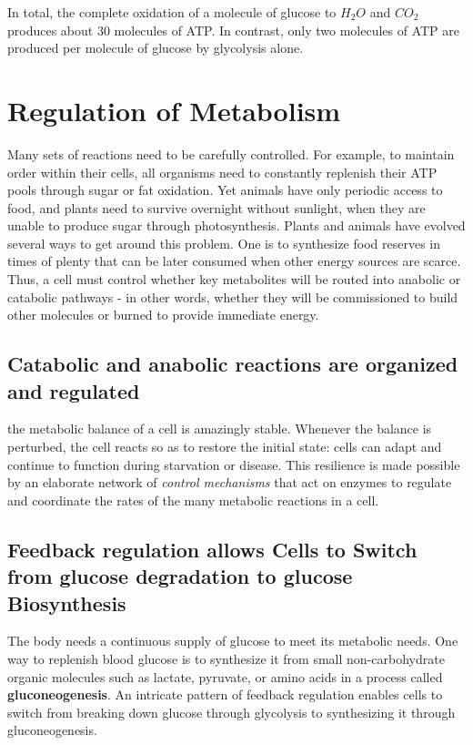In total, the complete oxidation of a molecule of glucose to $H_{2}O$ and $CO_2$
produces about 30 molecules of ATP. In contrast, only two molecules
of ATP are produced per molecule of glucose by glycolysis alone.

\section{Regulation of Metabolism}

Many sets of reactions need to be carefully controlled. For example, to
maintain order within their cells, all organisms need to constantly replenish
their ATP pools through sugar or fat oxidation.
Yet animals have only periodic access to food, and plants need to survive
overnight without sunlight, when they are unable to produce sugar
through photosynthesis. Plants and animals have evolved several ways
to get around this problem. One is to synthesize food reserves in times of
plenty that can be later consumed when other energy sources are scarce.
Thus, a cell must control whether key metabolites will be routed into
anabolic or catabolic pathways - in other words, whether they will be
commissioned to build other molecules or burned to provide immediate
energy.

\subsection{Catabolic and anabolic reactions are organized and regulated}

the metabolic balance of a cell is amazingly stable. Whenever the balance is perturbed,
the cell reacts so as to restore the initial state: cells
can adapt and continue to function during starvation or disease. This
resilience is made possible by an elaborate network of \textit{control mechanisms}
that act on enzymes to regulate and coordinate the rates of the
many metabolic reactions in a cell.

\subsection{Feedback regulation allows Cells to Switch from glucose degradation to glucose Biosynthesis}

The body needs a continuous supply of glucose to meet its metabolic
needs. One way to replenish blood glucose is to synthesize it from
small non-carbohydrate organic molecules such as lactate, pyruvate, or
amino acids in a process called \textbf{gluconeogenesis}. An intricate pattern of
feedback regulation enables cells to switch from breaking down glucose
through glycolysis to synthesizing it through gluconeogenesis.

